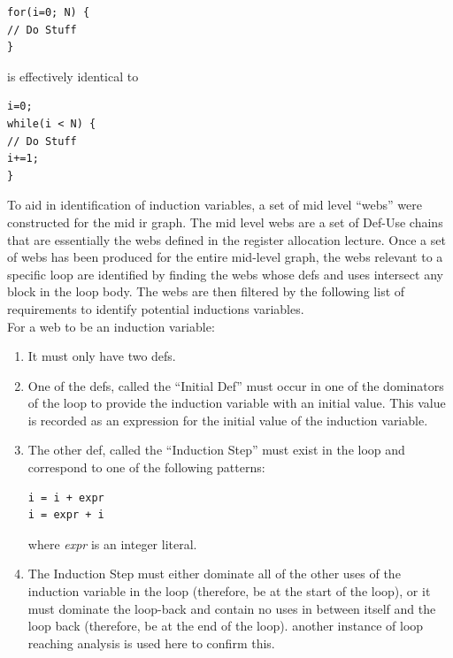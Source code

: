 \documentclass[11pt]{article}
\begin{document}
\begin{verbatim} 
for(i=0; N) { 
// Do Stuff
}
\end{verbatim}

\noindent is effectively identical to 

\begin{verbatim} 
i=0; 
while(i < N) { 
// Do Stuff 
i+=1;
}
\end{verbatim} 

\noindent To aid in identification of induction variables, a set of
mid level ``webs'' were constructed for the mid ir graph. The mid
level webs are a set of Def-Use chains that are essentially the webs
defined in the register allocation lecture. Once a set of webs has
been produced for the entire mid-level graph, the webs relevant to a
specific loop are identified by finding the webs whose defs and uses
intersect any block in the loop body. The webs are then filtered by
the following list of requirements to identify potential inductions
variables.\\ 

\noindent For a web to be an induction variable: 

\begin{enumerate} 

\item It must only have two defs. 

\item One of the defs, called the ``Initial Def'' must occur in one of the
  dominators of the loop to provide the induction variable with an
  initial value. This value is recorded as an expression for the
  initial value of the induction variable. 

\item The other def, called the ``Induction Step'' must exist in the
  loop and correspond to one of the following patterns: 
\begin{verbatim}
i = i + expr 
i = expr + i
\end{verbatim}
where \emph{expr} is an integer literal. 

\item The Induction Step must either dominate all of the other uses of
  the induction variable in the loop (therefore, be at the start of
  the loop), or it must dominate the loop-back and contain no uses in
  between itself and the loop back (therefore, be at the end of the
  loop). another instance of loop reaching analysis is used here to
  confirm this. 

\end{enumerate} 
\end{document}
